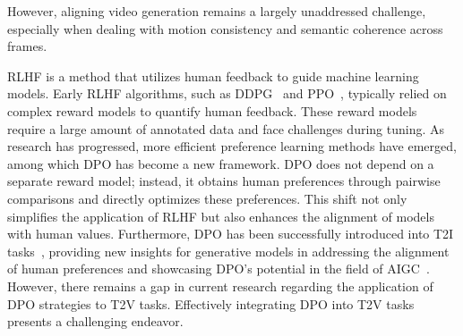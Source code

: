 However, aligning video generation remains a largely unaddressed challenge, especially when dealing with motion consistency and semantic coherence across frames.
\fi

RLHF \cite{gao2023scaling,stiennon2020learning,rafailov2024direct} is a method that utilizes human feedback to guide machine learning models. Early RLHF algorithms, such as DDPG~\cite{lillicrap2015continuous} and PPO~\cite{schulman2017proximal}, typically relied on complex reward models to quantify human feedback. These reward models require a large amount of annotated data and face challenges during tuning. As research has progressed, more efficient preference learning methods have emerged, among which DPO has become a new framework. DPO does not depend on a separate reward model; instead, it obtains human preferences through pairwise comparisons and directly optimizes these preferences. This shift not only simplifies the application of RLHF but also enhances the alignment of models with human values. Furthermore, DPO has been successfully introduced into T2I tasks~\cite{wallace2024diffusion,yang2024using}, providing new insights for generative models in addressing the alignment of human preferences and showcasing DPO's potential in the field of AIGC~\cite{shi2024instantbooth,
qing2024hierarchical,menapace2024snap,koley2024s}. However, there remains a gap in current research regarding the application of DPO strategies to T2V tasks. Effectively integrating DPO into T2V tasks presents a challenging endeavor.

